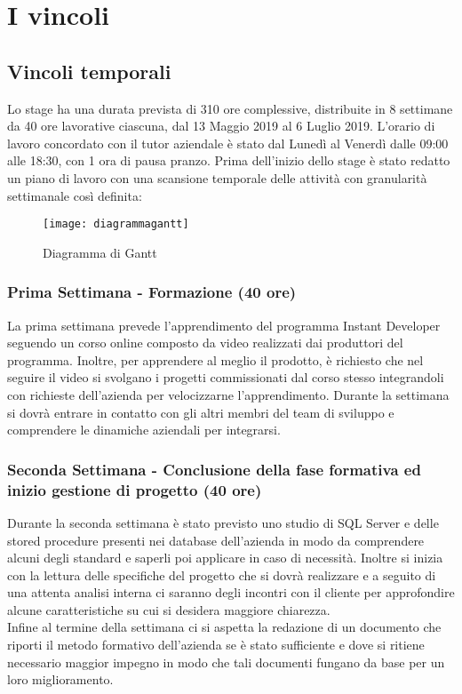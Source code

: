 \section{I vincoli}
\subsection{Vincoli temporali}
Lo stage ha una durata prevista di 310 ore complessive, distribuite in 8 settimane da 40 ore lavorative ciascuna, dal 13 Maggio 2019 al 6 Luglio 2019. L'orario di lavoro concordato con il tutor aziendale è stato dal Lunedì al Venerdì dalle 09:00 alle 18:30, con 1 ora di pausa pranzo. Prima dell'inizio dello stage è stato redatto un piano di lavoro con una scansione temporale delle attività con granularità settimanale così definita:


\begin{figure}[!h] 
	\centering 
	\texttt{[image: diagrammagantt]} 
	\caption{Diagramma di Gantt}
	\label{Gantt}
\end{figure}


\subsubsection*{Prima Settimana - Formazione (40 ore)}
La prima settimana prevede l'apprendimento del programma Instant Developer seguendo un corso online composto da video realizzati dai produttori del programma. Inoltre, per apprendere al meglio il prodotto, è richiesto che nel seguire il video si svolgano i progetti commissionati dal corso stesso integrandoli con richieste dell'azienda per velocizzarne l'apprendimento. Durante la settimana si dovrà entrare in contatto con gli altri membri del team di sviluppo e comprendere le dinamiche aziendali per integrarsi.

\subsubsection*{Seconda Settimana - Conclusione della fase formativa ed inizio gestione di progetto (40 ore)}
Durante la seconda settimana è stato previsto uno studio di SQL Server e delle stored procedure presenti nei database dell'azienda in modo da comprendere alcuni degli standard e saperli poi applicare in caso di necessità. Inoltre si inizia con la lettura delle specifiche del progetto che si dovrà realizzare e a seguito di una attenta analisi interna ci saranno degli incontri con il cliente per approfondire alcune caratteristiche su cui si desidera maggiore chiarezza. \\
Infine al termine della settimana ci si aspetta la redazione di un documento che riporti il metodo formativo dell'azienda se è stato sufficiente e dove si ritiene necessario maggior impegno in modo che tali documenti fungano da base per un loro miglioramento.

